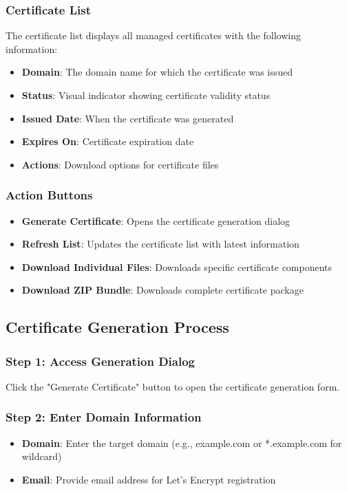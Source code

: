 \subsubsection{Certificate List}
The certificate list displays all managed certificates with the following information:
\begin{itemize}
    \item \textbf{Domain}: The domain name for which the certificate was issued
    \item \textbf{Status}: Visual indicator showing certificate validity status
    \item \textbf{Issued Date}: When the certificate was generated
    \item \textbf{Expires On}: Certificate expiration date
    \item \textbf{Actions}: Download options for certificate files
\end{itemize}

\subsubsection{Action Buttons}
\begin{itemize}
    \item \textbf{Generate Certificate}: Opens the certificate generation dialog
    \item \textbf{Refresh List}: Updates the certificate list with latest information
    \item \textbf{Download Individual Files}: Downloads specific certificate components
    \item \textbf{Download ZIP Bundle}: Downloads complete certificate package
\end{itemize}

\subsection{Certificate Generation Process}

\subsubsection{Step 1: Access Generation Dialog}
Click the "Generate Certificate" button to open the certificate generation form.

\subsubsection{Step 2: Enter Domain Information}
\begin{itemize}
    \item \textbf{Domain}: Enter the target domain (e.g., example.com or *.example.com for wildcard)
    \item \textbf{Email}: Provide email address for Let's Encrypt registration
\end{itemize}

